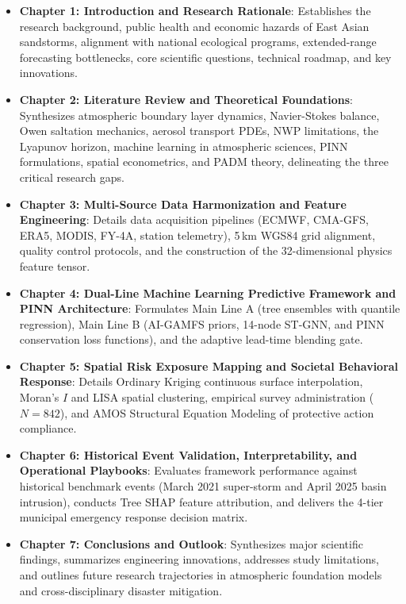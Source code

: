\begin{itemize}
    \item \textbf{Chapter 1: Introduction and Research Rationale}: Establishes the research background, public health and economic hazards of East Asian sandstorms, alignment with national ecological programs, extended-range forecasting bottlenecks, core scientific questions, technical roadmap, and key innovations.
    \item \textbf{Chapter 2: Literature Review and Theoretical Foundations}: Synthesizes atmospheric boundary layer dynamics, Navier-Stokes balance, Owen saltation mechanics, aerosol transport PDEs, NWP limitations, the Lyapunov horizon, machine learning in atmospheric sciences, PINN formulations, spatial econometrics, and PADM theory, delineating the three critical research gaps.
    \item \textbf{Chapter 3: Multi-Source Data Harmonization and Feature Engineering}: Details data acquisition pipelines (ECMWF, CMA-GFS, ERA5, MODIS, FY-4A, station telemetry), 5\,km WGS84 grid alignment, quality control protocols, and the construction of the 32-dimensional physics feature tensor.
    \item \textbf{Chapter 4: Dual-Line Machine Learning Predictive Framework and PINN Architecture}: Formulates Main Line A (tree ensembles with quantile regression), Main Line B (AI-GAMFS priors, 14-node ST-GNN, and PINN conservation loss functions), and the adaptive lead-time blending gate.
    \item \textbf{Chapter 5: Spatial Risk Exposure Mapping and Societal Behavioral Response}: Details Ordinary Kriging continuous surface interpolation, Moran's $I$ and LISA spatial clustering, empirical survey administration ($N=842$), and AMOS Structural Equation Modeling of protective action compliance.
    \item \textbf{Chapter 6: Historical Event Validation, Interpretability, and Operational Playbooks}: Evaluates framework performance against historical benchmark events (March 2021 super-storm and April 2025 basin intrusion), conducts Tree SHAP feature attribution, and delivers the 4-tier municipal emergency response decision matrix.
    \item \textbf{Chapter 7: Conclusions and Outlook}: Synthesizes major scientific findings, summarizes engineering innovations, addresses study limitations, and outlines future research trajectories in atmospheric foundation models and cross-disciplinary disaster mitigation.
\end{itemize}
